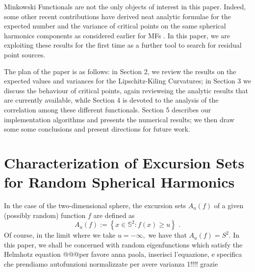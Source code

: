 \documentclass[aps,prd,showpacs,superscriptaddress,groupedaddress]{revtex4-1}  %
\begin{document}
Minkowski Functionals are not the only objects of interest in this paper. Indeed, some other recent contributions have derived neat analytic formulae for the expected number and the variance of critical points on the same spherical harmonics components as considered earlier for MFs \cite{cm1603}. In this paper, we are exploiting these results for the first time as a further tool to search for residual point sources.   


The plan of the paper is as follows: in Section 2, we review the results on the expected values and variances for the Lipschitz-Kiling Curvatures; in Section 3 we discuss the behaviour of critical points, again revieweing the analytic results that are currently available, while Section 4 is devoted to the analysis of the correlation among these different functionals. Section 5 describes our implementation algorithms and presents the numerical results; we then draw some some conclusions and present directions for future work.

\section{Characterization of Excursion Sets for Random Spherical Harmonics}

In the case of the two-dimensional sphere, the excursion sets $A_{u}(f)$ of a given (possibly random)
function $f$ are defined as
\begin{equation}
A_{u}(f):=\left\{ x\in \mathbb{S}^{2}:f(x)\geq u\right\} \text{ .}
\end{equation}
Of course, in the limit where we take $u=-\infty ,$ we have that $%
A_{u}(f)=S^{2}$. In this paper, we shall be concerned with random eigenfunctions which satisfy the Helmhotz equation @@@per favore anna paola, inserisci l'equazione, e specifica che prendiamo autofunzioni normalizzate per avere varianza 1!!!! grazie
\end{document}
